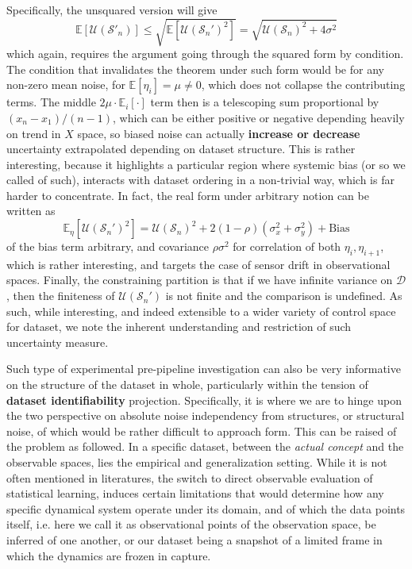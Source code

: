 Specifically, the unsquared version will give
\begin{equation}
    \mathbb{E}[\mathcal{U}(\mathcal{S}'_{n})] \leq \sqrt{\mathbb{E}[\mathcal{U}(\mathcal{S}_{n}')^{2}]} = \sqrt{\mathcal{U}(\mathcal{S}_{n})^{2}+ 4\sigma^{2}}
\end{equation}
which again, requires the argument going through the squared form by condition. The condition that invalidates the theorem under such form would be for any non-zero mean noise, for $\mathbb{E}[\eta_{i}]=\mu\neq 0$, which does not collapse the contributing terms. The middle $2\mu\cdot \mathbb{E}_{i}[\cdot]$ term then is a telescoping sum proportional by $(x_{n}-x_{1})/(n-1)$, which can be either positive or negative depending heavily on trend in $X$ space, so biased noise can actually \textbf{increase or decrease} uncertainty extrapolated depending on dataset structure. This is rather interesting, because it highlights a particular region where systemic bias (or so we called of such), interacts with dataset ordering in a non-trivial way, which is far harder to concentrate. In fact, the real form under arbitrary notion can be written as 
\begin{equation}
    \mathbb{E}_{\eta}[\mathcal{U}(\mathcal{S}_{n}')^{2}] = \mathcal{U}(\mathcal{S}_{n})^{2} + 2(1-\rho)(\sigma^{2}_{x}+\sigma_{y}^{2}) + \mathrm{Bias}
\end{equation}
of the bias term arbitrary, and covariance $\rho\sigma^{2}$ for correlation of both $\eta_{i},\eta_{i+1}$, which is rather interesting, and targets the case of sensor drift in observational spaces. Finally, the constraining partition is that if we have infinite variance on $\mathcal{D}$, then the finiteness of $\mathcal{U}(\mathcal{S}_{n}')$ is not finite and the comparison is undefined. As such, while interesting, and indeed extensible to a wider variety of control space for dataset, we note the inherent understanding and restriction of such uncertainty measure. 

Such type of experimental pre-pipeline investigation can also be very informative on the structure of the dataset in whole, particularly within the tension of \textbf{dataset identifiability} projection. Specifically, it is where we are to hinge upon the two perspective on absolute noise independency from structures, or structural noise, of which would be rather difficult to approach form. This can be raised of the problem as followed. In a specific dataset, between the \textit{actual concept} and the observable spaces, lies the empirical and generalization setting. While it is not often mentioned in literatures, the switch to direct observable evaluation of statistical learning, induces certain limitations that would determine how any specific dynamical system operate under its domain, and of which the data points itself, i.e. here we call it as observational points of the observation space, be inferred of one another, or our dataset being a snapshot of a limited frame in which the dynamics are frozen in capture. 

